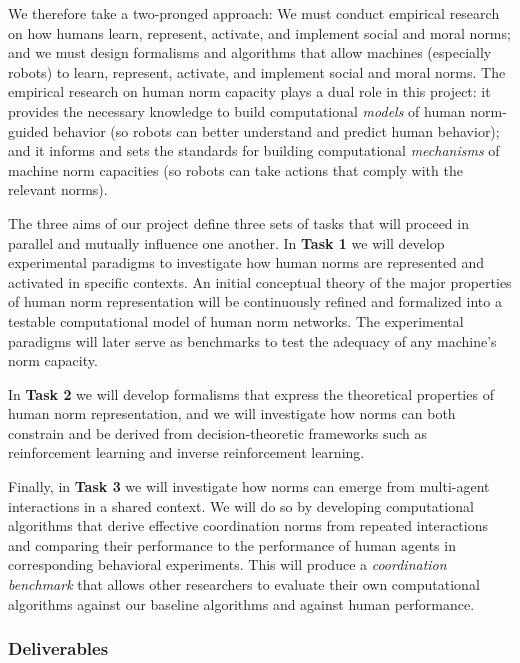 \documentclass[12pt]{article}
\begin{document}
We therefore take a two-pronged approach: We must conduct empirical
research on how humans learn, represent, activate, and implement
social and moral norms; and we must design formalisms and algorithms
that allow machines (especially robots) to learn, represent, activate,
and implement social and moral norms.  The empirical research on human
norm capacity plays a dual role in this project: it provides the
necessary knowledge to build computational {\em models} of human
norm-guided behavior (so robots can better understand and predict
human behavior); and it informs and sets the standards for building
computational {\em mechanisms} of machine norm capacities (so robots
can take actions that comply with the relevant norms).


The three aims of our project define three sets of tasks that will
proceed in parallel and mutually influence one another.  In {\bf Task
  1} we will develop experimental paradigms to investigate how human
norms are represented and activated in specific contexts.  An
initial conceptual theory of the major properties of human norm
representation will be continuously refined and formalized into a
testable computational model of human norm networks. The experimental
paradigms will later serve as benchmarks to test the adequacy of any
machine's norm capacity.

In {\bf Task 2} we will develop formalisms that express the
theoretical properties of human norm representation, and we will
investigate how norms can both constrain and be derived from
decision-theoretic frameworks such as reinforcement learning and
inverse reinforcement learning.

Finally, in {\bf Task 3} we will investigate how norms can emerge from
multi-agent interactions in a shared context. We will do so by
developing computational algorithms that derive effective coordination
norms from repeated interactions and comparing their performance to
the performance of human agents in corresponding behavioral
experiments. This will produce a {\em coordination benchmark} that
allows other researchers to evaluate their own computational
algorithms against our baseline algorithms and against human
performance.

\subsubsection*{Deliverables}
\end{document}

